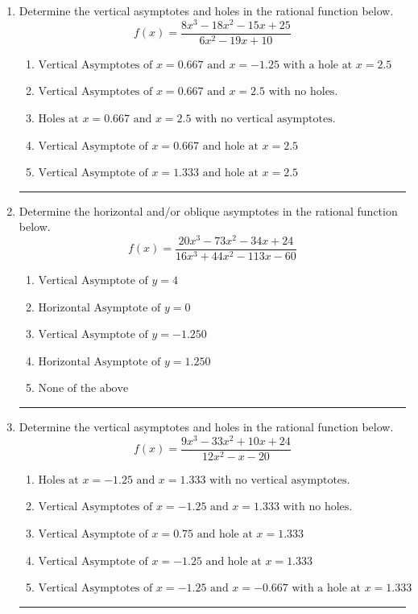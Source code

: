 \documentclass[14pt]{extbook}
\newcommand{\litem}[1]{\item#1\hspace*{-1cm}\rule{\textwidth}{0.4pt}}
\begin{document}
\begin{enumerate}
{\begin{enumerate}[label=\Alph*.]
\end{enumerate} }
\litem{
Determine the vertical asymptotes and holes in the rational function below.\[ f(x) = \frac{8x^{3} -18 x^{2} -15 x + 25}{6x^{2} -19 x + 10} \]\begin{enumerate}[label=\Alph*.]
\item \( \text{Vertical Asymptotes of } x = 0.667 \text{ and } x = -1.25 \text{ with a hole at } x = 2.5 \)
\item \( \text{Vertical Asymptotes of } x = 0.667 \text{ and } x = 2.5 \text{ with no holes.} \)
\item \( \text{Holes at } x = 0.667 \text{ and } x = 2.5 \text{ with no vertical asymptotes.} \)
\item \( \text{Vertical Asymptote of } x = 0.667 \text{ and hole at } x = 2.5 \)
\item \( \text{Vertical Asymptote of } x = 1.333 \text{ and hole at } x = 2.5 \)

\end{enumerate} }
\litem{
Determine the horizontal and/or oblique asymptotes in the rational function below.\[ f(x) = \frac{20x^{3} -73 x^{2} -34 x + 24}{16x^{3} +44 x^{2} -113 x -60} \]\begin{enumerate}[label=\Alph*.]
\item \( \text{Vertical Asymptote of } y = 4  \)
\item \( \text{Horizontal Asymptote of } y = 0  \)
\item \( \text{Vertical Asymptote of } y = -1.250  \)
\item \( \text{Horizontal Asymptote of } y = 1.250  \)
\item \( \text{None of the above} \)

\end{enumerate} }
\litem{
Determine the vertical asymptotes and holes in the rational function below.\[ f(x) = \frac{9x^{3} -33 x^{2} +10 x + 24}{12x^{2} -x -20} \]\begin{enumerate}[label=\Alph*.]
\item \( \text{Holes at } x = -1.25 \text{ and } x = 1.333 \text{ with no vertical asymptotes.} \)
\item \( \text{Vertical Asymptotes of } x = -1.25 \text{ and } x = 1.333 \text{ with no holes.} \)
\item \( \text{Vertical Asymptote of } x = 0.75 \text{ and hole at } x = 1.333 \)
\item \( \text{Vertical Asymptote of } x = -1.25 \text{ and hole at } x = 1.333 \)
\item \( \text{Vertical Asymptotes of } x = -1.25 \text{ and } x = -0.667 \text{ with a hole at } x = 1.333 \)


\end{enumerate}}
\end{enumerate}
\end{document}
